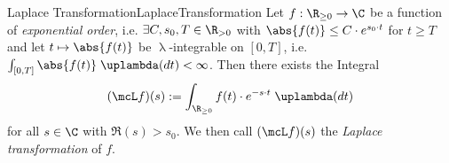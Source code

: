 \begin{msatdef}{Laplace Transformation}{LaplaceTransformation}
    Let $f:\R_{\geq 0}\to\C$ be a function of \emph{exponential order}, i.e. $\exists C,s_0,T\in\R_{>0}$ with $\abs{f(t)}\leq C\cdot e^{s_0\cdot t}$ for $t\geq T$ and let $t\mapsto \abs{f(t)}$ be $\uplambda$-integrable on $[0,T]$, i.e. $\int_{[0,T]}\abs{f(t)}\;\uplambda(dt)<\infty$. Then there exists the Integral
    \[
        (\mcL f)(s) := \int_{\R_{\geq 0}}f(t)\cdot e^{-s\cdot t}\;\uplambda(dt)
    \] 
    for all $s\in \C$ with $\Re(s)>s_0$. We then call $(\mcL f)(s)$ the \emph{Laplace transformation} of $f$.
\end{msatdef}